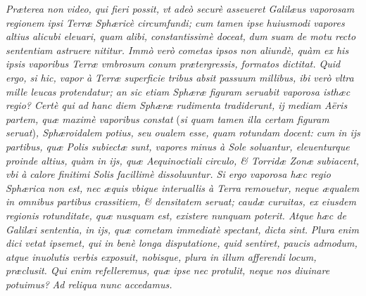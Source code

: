 \documentclass[11pt,twoside,openany]{book}
\begin{document}
\par\bigskip\noindent{}\enspace \textit{Præterea non video, qui fieri possit, vt adeò securè asseueret Galilæus vaporosam regionem ipsi Terræ Sphæricè circumfundi; cum tamen ipse huiusmodi vapores altius alicubi eleuari, quam alibi, constantissimè doceat, }\textit{dum suam de motu recto sententiam astruere nititur. Immò verò cometas ipsos non aliundè, quàm ex his ipsis vaporibus Terræ vmbrosum conum prætergressis, formatos dictitat. Quid ergo, si hic, vapor à Terræ superficie tribus absit passuum millibus, ibi verò vltra mille leucas protendatur; an sic etiam Sphæræ figuram seruabit vaporosa isthæc regio? Certè qui ad hanc diem Sphæræ rudimenta tradiderunt, ij mediam Aëris partem, quæ maximè vaporibus constat }(\textit{si quam tamen illa certam figuram seruat})\textit{, Sphæroidalem potius, seu oualem esse, quam rotundam docent: cum in ijs partibus, quæ Polis subiectæ sunt, vapores minus à Sole soluantur, eleuenturque proinde altius, quàm in ijs, quæ Aequinoctiali circulo, \& Torridæ Zonæ subiacent, vbi à calore finitimi Solis facillimè dissoluuntur. Si ergo vaporosa hæc regio Sphærica non est, nec æquis vbique interuallis à Terra remouetur, neque æqualem in omnibus partibus crassitiem, \& densitatem seruat; caudæ curuitas, ex eiusdem regionis rotunditate, quæ nusquam est, existere nunquam poterit. Atque hæc de Galilæi sententia, in ijs, quæ cometam immediatè spectant, dicta sint. }\textit{Plura enim dici vetat ipsemet, qui in benè longa disputatione, quid sentiret, paucis admodum, atque inuolutis verbis exposuit, nobisque, plura in illum afferendi locum, præclusit. Qui enim refelleremus, quæ ipse nec protulit, neque nos diuinare potuimus? }\textit{Ad reliqua nunc accedamus.}
\end{document}

